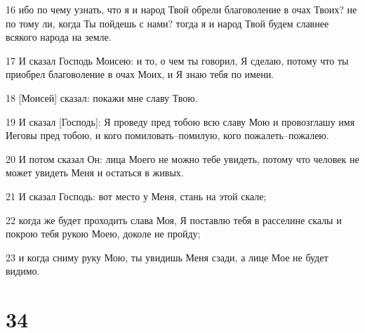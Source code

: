 \par 16 ибо по чему узнать, что я и народ Твой обрели благоволение в очах Твоих? не по тому ли, когда Ты пойдешь с нами? тогда я и народ Твой будем славнее всякого народа на земле.
\par 17 И сказал Господь Моисею: и то, о чем ты говорил, Я сделаю, потому что ты приобрел благоволение в очах Моих, и Я знаю тебя по имени.
\par 18 [Моисей] сказал: покажи мне славу Твою.
\par 19 И сказал [Господь]: Я проведу пред тобою всю славу Мою и провозглашу имя Иеговы пред тобою, и кого помиловать--помилую, кого пожалеть--пожалею.
\par 20 И потом сказал Он: лица Моего не можно тебе увидеть, потому что человек не может увидеть Меня и остаться в живых.
\par 21 И сказал Господь: вот место у Меня, стань на этой скале;
\par 22 когда же будет проходить слава Моя, Я поставлю тебя в расселине скалы и покрою тебя рукою Моею, доколе не пройду;
\par 23 и когда сниму руку Мою, ты увидишь Меня сзади, а лице Мое не будет видимо.

\chapter{34}

